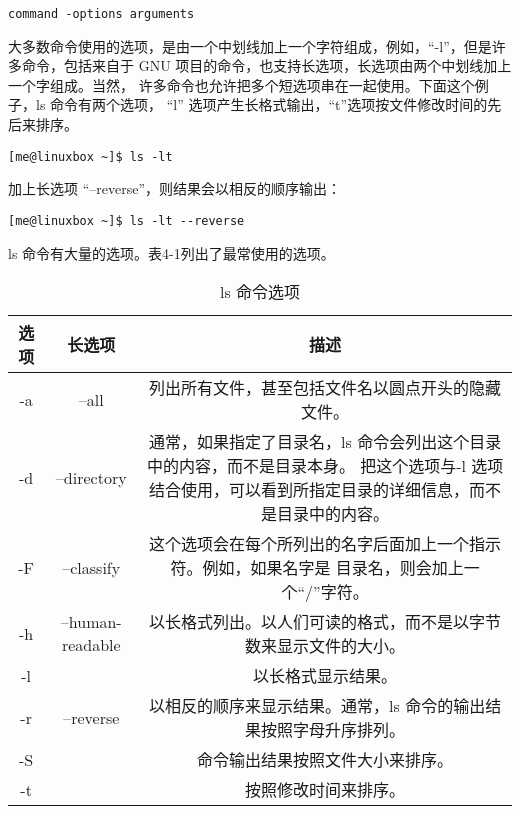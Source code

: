 \begin{lstlisting}
command -options arguments
\end{lstlisting}

\par 大多数命令使用的选项，是由一个中划线加上一个字符组成，例如，“-l”，但是许多命令，包括来自于 GNU 项目的命令，也支持长选项，长选项由两个中划线加上一个字组成。当然， 许多命令也允许把多个短选项串在一起使用。下面这个例子，ls 命令有两个选项， “l” 选项产生长格式输出，“t”选项按文件修改时间的先后来排序。

\begin{lstlisting}
[me@linuxbox ~]$ ls -lt
\end{lstlisting}

\par 加上长选项 “–reverse”，则结果会以相反的顺序输出：

\begin{lstlisting}
[me@linuxbox ~]$ ls -lt --reverse
\end{lstlisting}

\par ls 命令有大量的选项。表4-1列出了最常使用的选项。

\begin{table}[ht!]
\caption{ls 命令选项}
\label{table_example}
\centering
\begin{tabular}{c|c|c}
\hline
 选项 & 长选项 & 描述 \\
\hline
 -a & --all & 列出所有文件，甚至包括文件名以圆点开头的隐藏文件。 \\
-d & --directory & 通常，如果指定了目录名，ls 命令会列出这个目录中的内容，而不是目录本身。 把这个选项与-l 选项结合使用，可以看到所指定目录的详细信息，而不是目录中的内容。\\
-F & --classify	& 这个选项会在每个所列出的名字后面加上一个指示符。例如，如果名字是 目录名，则会加上一个``/''字符。 \\
-h & --human-readable & 以长格式列出。以人们可读的格式，而不是以字节数来显示文件的大小。\\
-l & & 以长格式显示结果。\\
-r & --reverse & 以相反的顺序来显示结果。通常，ls 命令的输出结果按照字母升序排列。 \\
-S & & 命令输出结果按照文件大小来排序。\\
-t & & 按照修改时间来排序。\\
\hline
\end{tabular}
\end{table}


